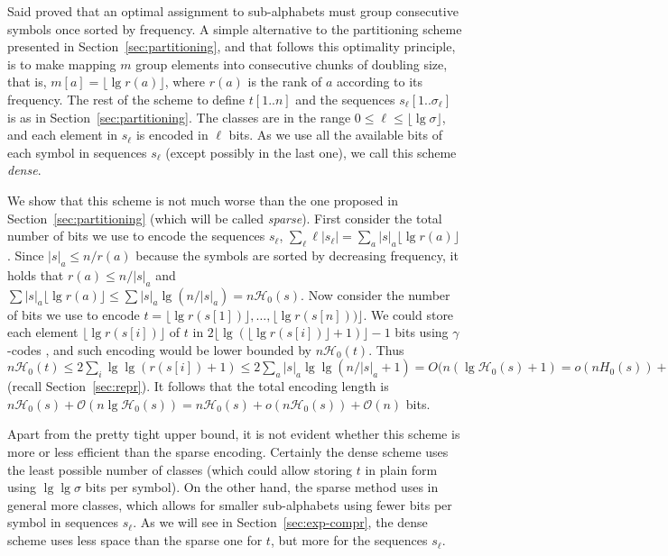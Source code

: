 \documentclass[11pt]{article}
\newcommand{\Oh}[1]
    {\ensuremath{\mathcal{O}\left( {#1} \right)}}
\newcommand{\HH}{\mathcal{H}}
\newcommand{\Ho}{\HH_0}
\newcommand{\mapping}{\ensuremath{{m}}}
\begin{document}
Said \cite{Sai05} proved that an optimal assignment to sub-alphabets must
group consecutive symbols once sorted by frequency. A simple alternative
to the partitioning scheme presented in Section~\ref{sec:partitioning}, and
that follows this optimality principle, is to make mapping $\mapping$ 
group elements into consecutive chunks of doubling size, that
is, $\mapping[a] = \lfloor \lg r(a) \rfloor$, where $r(a)$ is the
rank of $a$ according to its frequency. 
The rest of the scheme to define $t[1..n]$ and the sequences
$s_\ell[1..\sigma_\ell]$ is as in Section~\ref{sec:partitioning}. The
classes are in the range $0 \le \ell \le \lfloor \lg\sigma \rfloor$,
and each element in $s_\ell$ is encoded in $\ell$ bits. As we use all the
available bits of each symbol in sequences $s_\ell$ (except possibly in the
last one), we call this scheme {\em dense}.

We show that this scheme is not much worse than the one proposed in
Section~\ref{sec:partitioning} (which will be called {\em sparse}). 
First consider the total number of bits we use to encode the sequences 
$s_\ell$, $\sum_\ell \ell |s_\ell| = \sum_a |s|_a \lfloor \lg r(a) \rfloor$.
Since $|s|_a \le n / r(a)$ because the symbols are sorted by decreasing
frequency, it holds that $r(a) \le n / |s|_a$ and 
$\sum |s|_a \lfloor \lg r(a) \rfloor \le \sum |s|_a \lg (n / |s|_a) = n\Ho(s)$.
Now consider the number of bits we use to encode 
$t = \lfloor \lg r(s[1]) \rfloor , \ldots, \lfloor \lg r(s[n])) \rfloor$.  
We could store each element $\lfloor \lg r(s[i]) \rfloor$ of $t$ in 
$2 \lfloor \lg (\lfloor \lg r(s[i]) \rfloor + 1) \rfloor - 1$ bits using
$\gamma$-codes \cite{WMB99}, and such encoding would be lower bounded by 
$n\Ho(t)$. Thus
$   n\Ho(t) 
\le 2 \sum_i \lg\lg (r(s[i])+1)
\le 2 \sum_a |s|_a \lg\lg (n/|s|_a+1)
= O(n(\lg\Ho(s) + 1)
= o(n H_0 (s)) + O(n)$
(recall Section~\ref{sec:repr}). It follows that the total encoding length is
$n\Ho(s) + \Oh{n\lg\Ho(s)} = n\Ho(s)+o(n\Ho(s)) + \Oh{n}$ bits.

Apart from the pretty tight upper bound, it is not evident whether this scheme 
is more or less efficient than the sparse encoding. Certainly the dense scheme 
uses the least possible number of classes (which could allow storing $t$ in 
plain form using $\lg\lg\sigma$ bits per symbol). On the other hand, the sparse
method uses in general more classes, which allows for smaller sub-alphabets 
using fewer bits per symbol in sequences $s_\ell$. As we will see in 
Section~\ref{sec:exp-compr}, the dense scheme uses less space than the sparse 
one for $t$, but more for the sequences $s_\ell$.
\end{document}
